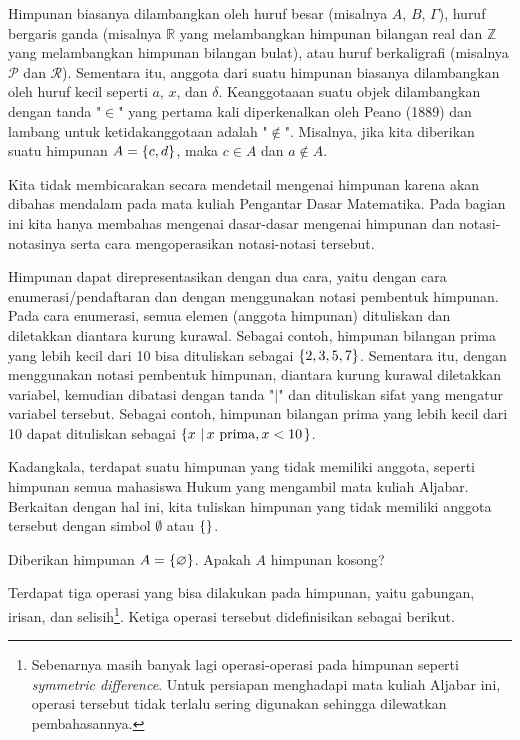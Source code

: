\par Himpunan biasanya dilambangkan oleh huruf besar (misalnya $ A $, $ B $, $ \Gamma $), huruf bergaris ganda (misalnya $ \mathbb{R} $ yang melambangkan himpunan bilangan real dan $ \mathbb{Z} $ yang melambangkan himpunan bilangan bulat), atau huruf berkaligrafi (misalnya $ \mathcal{P} $ dan $ \mathcal{R} $). Sementara itu, anggota dari suatu himpunan biasanya dilambangkan oleh huruf kecil seperti $ a $, $ x $, dan $ \delta $. Keanggotaaan suatu objek dilambangkan dengan tanda "$ \in $" yang pertama kali diperkenalkan oleh Peano (1889) dan lambang untuk ketidakanggotaan adalah "$ \notin $". Misalnya, jika kita diberikan suatu himpunan $ A = \mathop{}\!\left\lbrace c, d\right\rbrace $, maka $ c \in A $ dan $ a \notin A $.

\par Kita tidak membicarakan secara mendetail mengenai himpunan karena akan dibahas mendalam pada mata kuliah Pengantar Dasar Matematika. Pada bagian ini kita hanya membahas mengenai dasar-dasar mengenai himpunan dan notasi-notasinya serta cara mengoperasikan notasi-notasi tersebut.

\par Himpunan dapat direpresentasikan dengan dua cara, yaitu dengan cara enumerasi/pendaftaran dan dengan menggunakan notasi pembentuk himpunan. Pada cara enumerasi, semua elemen (anggota himpunan) dituliskan dan diletakkan diantara kurung kurawal. Sebagai contoh, himpunan bilangan prima yang lebih kecil dari 10 bisa dituliskan sebagai $ \mathop{}\!\left\lbrace2, 3, 5, 7\right\rbrace $. Sementara itu, dengan menggunakan notasi pembentuk himpunan, diantara kurung kurawal diletakkan variabel, kemudian dibatasi dengan tanda "$ | $" dan dituliskan sifat yang mengatur variabel tersebut. Sebagai contoh, himpunan bilangan prima yang lebih kecil dari 10 dapat dituliskan sebagai $ \mathop{}\!\left\lbrace{{x} \, \left|\, {x \mbox{ prima}, x < 10}\right.}\right\rbrace $.

\par Kadangkala, terdapat suatu himpunan yang tidak memiliki anggota, seperti himpunan semua mahasiswa Hukum yang mengambil mata kuliah Aljabar. Berkaitan dengan hal ini, kita tuliskan himpunan yang tidak memiliki anggota tersebut dengan simbol $ \emptyset $ atau $ \mathop{}\!\left\lbrace\right\rbrace $.

\begin{explbox}
	Diberikan himpunan $ A = \mathop{}\!\left\lbrace\varnothing\right\rbrace $. Apakah $ A $ himpunan kosong?
\end{explbox}

\par Terdapat tiga operasi yang bisa dilakukan pada himpunan, yaitu gabungan, irisan, dan selisih\footnote{Sebenarnya masih banyak lagi operasi-operasi pada himpunan seperti \textit{symmetric difference}. Untuk persiapan menghadapi mata kuliah Aljabar ini, operasi tersebut tidak terlalu sering digunakan sehingga dilewatkan pembahasannya.}. Ketiga operasi tersebut didefinisikan sebagai berikut.

